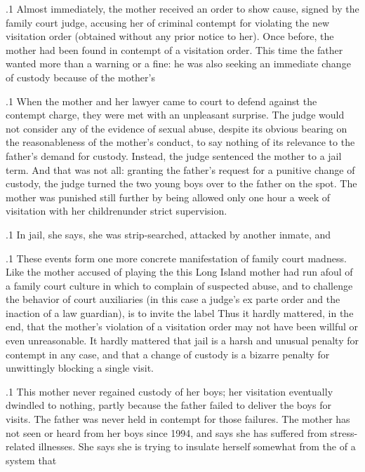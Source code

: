 \documentclass[11pt, twoside]{article}
\begin{document}
{\p.1{%
Almost immediately, the mother received an order to show cause,
signed by the family court judge, accusing her of criminal contempt for
violating the new visitation order (obtained without any prior notice to
her). Once before, the mother had been found in contempt of a visitation
order. This time the father wanted more than a warning or a fine: he was
also seeking an immediate change of custody because of the mother’s
}%

\p.1{%
When the mother and her lawyer came to court to defend against
the contempt charge, they were met with an unpleasant surprise. The
judge would not consider any of the evidence of sexual abuse, despite its
obvious bearing on the reasonableness of the mother’s conduct, to say
nothing of its relevance to the father’s demand for custody. Instead, the
judge sentenced the mother to a jail term. And that was not all: granting
the father’s request for a punitive change of custody, the judge turned the
two young boys over to the father on the spot. The mother was punished
still further by being allowed only one hour a week of visitation with her
children\mdash{}under strict supervision.
}%

\p.1{%
In jail, she says, she was strip-searched, attacked by another inmate,
and 
}%

\p.1{%
These events form one more concrete manifestation of family court
madness. Like the mother accused of playing the  this
Long Island mother had run afoul of a family court culture in which
to complain of suspected abuse, and to challenge the behavior of court
auxiliaries (in this case a judge’s ex parte order and the inaction of a law
guardian), is to invite the label  Thus it hardly mattered, in the
end, that the mother’s violation of a visitation order may not have been
willful or even unreasonable. It hardly mattered that jail is a harsh and
unusual penalty for contempt in any case, and that a change of custody
is a bizarre penalty for unwittingly blocking a single visit.
}%

\p.1{%
This mother never regained custody of her boys; her visitation eventually dwindled to nothing, partly because the father failed to deliver
the boys for visits. The father was never held in contempt for those failures. The mother has not seen or heard from her boys since 1994, and
says she has suffered from stress-related illnesses. She says she is trying
to insulate herself somewhat from the  of a system
that 
}%

}
\end{document}
